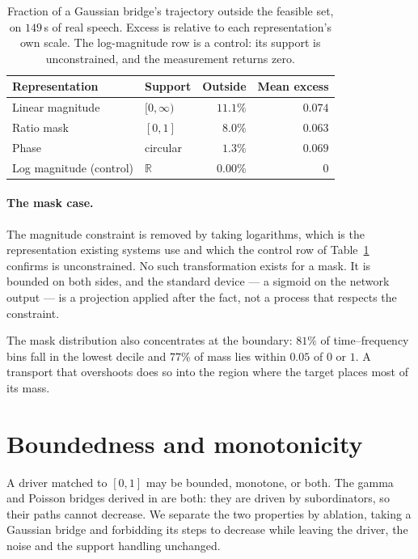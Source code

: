 \documentclass[11pt,a4paper]{article}
\def\R{\mathbb{R}}
\begin{document}
\begin{table}[h]
\centering\small
\caption{Fraction of a Gaussian bridge's trajectory outside the feasible set, on
$149$\,s of real speech. Excess is relative to each representation's own scale.
The log-magnitude row is a control: its support is unconstrained, and the
measurement returns zero.}
\label{tab:premise}
\begin{tabular}{llrr}
\toprule
Representation & Support & Outside & Mean excess \\
\midrule
Linear magnitude & $[0,\infty)$ & $11.1\%$ & $0.074$ \\
Ratio mask       & $[0,1]$      & $8.0\%$  & $0.063$ \\
Phase            & circular     & $1.3\%$  & $0.069$ \\
Log magnitude (control) & $\R$  & $0.00\%$ & $0$ \\
\bottomrule
\end{tabular}
\end{table}

\paragraph{The mask case.} The magnitude constraint is removed by taking logarithms, which is the
representation existing systems use and which the control row of
Table~\ref{tab:premise} confirms is unconstrained. No such transformation exists
for a mask. It is bounded on both sides, and the standard
device --- a sigmoid on the network output --- is a projection applied after the
fact, not a process that respects the constraint.

The mask distribution also concentrates at the boundary: $81\%$ of
time--frequency bins fall in the lowest decile and $77\%$ of mass lies within
$0.05$ of $0$ or $1$. A transport that overshoots does so into the region where
the target places most of its mass.

\section{Boundedness and monotonicity}
\label{sec:which}

A driver matched to $[0,1]$ may be bounded, monotone, or both. The gamma and
Poisson bridges derived in \cite{companion} are both: they are driven by
subordinators, so their paths cannot decrease. We separate the two properties
by ablation, taking a Gaussian bridge and forbidding its steps to decrease while
leaving the driver, the noise and the support handling unchanged.
\end{document}
